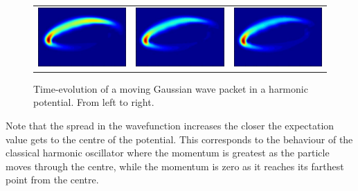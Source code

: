 \begin{figure}[H]
\begin{tabular}{ccc}
  \includegraphics[scale = 0.29]{QHO13.png} &   \includegraphics[scale = 0.29]{QHO14.png}   &   \includegraphics[scale = 0.29]{QHO15.png} \\
\end{tabular}
\caption{Time-evolution of a moving Gaussian wave packet in a harmonic potential. From left to right.}
\label{fig:QHO}
\end{figure} Note that the spread in the wavefunction increases the closer the expectation value gets to the centre of the potential. This corresponds to the behaviour of the classical harmonic oscillator where the momentum is greatest as the particle moves through the centre, while the momentum is zero as it reaches its farthest point from the centre.


